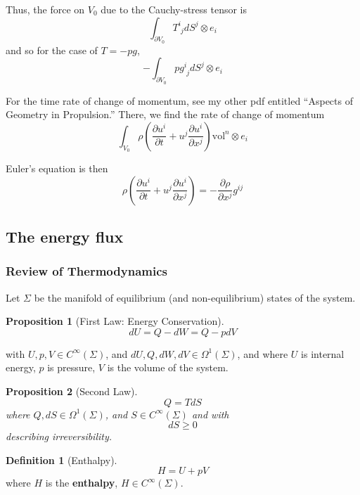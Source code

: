 \documentclass[twoside,landscape,10pt]{amsart}
\theoremstyle{plain}
\newtheorem{proposition}{Proposition}
\theoremstyle{definition}
\newtheorem{definition}{Definition}
\theoremstyle{remark}
\theoremstyle{remark}
\begin{document}
\begin{multicols*}{2}
Thus, the force on $V_0$ due to the Cauchy-stress tensor is 
\[
\int_{\partial V_0} T^i_{\,\,j}dS^j\otimes e_i
\]
and so for the case of $T = -pg$, 
\[
-\int_{\partial V_0} p g^i_{\,\,j} dS^j \otimes e_i
\]

For the time rate of change of momentum, see my other pdf entitled ``Aspects of Geometry in Propulsion.''  There, we find the rate of change of momentum
\[
\int_{V_0} \rho \left( \frac{\partial u^i}{ \partial t} + u^j \frac{ \partial u^i}{ \partial x^j} \right) \text{vol}^n \otimes e_i
\]

Euler's equation is then
\begin{equation}
  \rho \left( \frac{\partial u^i}{ \partial t} + u^j \frac{ \partial u^i}{ \partial x^j} \right) = - \frac{ \partial \rho }{ \partial x^j}g^{ij} 
\end{equation}



\subsection*{The energy flux}

\subsubsection*{Review of Thermodynamics}

Let $\Sigma$ be the manifold of equilibrium (and non-equilibrium) states of the system.  

\begin{proposition}[First Law: Energy Conservation]
\begin{equation}
dU = Q - dW = Q - pdV
\end{equation}
\end{proposition}
with $U, p ,V \in C^{\infty}(\Sigma)$, and $dU, Q, dW , dV \in \Omega^1(\Sigma)$, and where $U$ is internal energy, $p$ is pressure, $V$ is the volume of the system.  

\begin{proposition}[Second Law]
\begin{equation}
  Q = TdS
\end{equation} where $Q, dS \in \Omega^1(\Sigma)$, and $S \in C^{\infty}(\Sigma)$ and
with 
\begin{equation}
  dS \geq 0
\end{equation} describing irreversibility.  
\end{proposition}

\begin{definition}[Enthalpy]
  \begin{equation}
    H = U + pV
\end{equation}
where $H$ is the \textbf{enthalpy}, $H \in C^{\infty}(\Sigma)$.  
\end{definition}


\end{multicols*}
\end{document}
